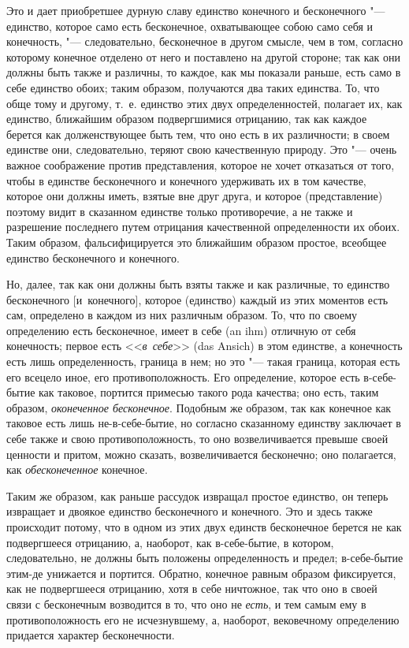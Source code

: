 Это и дает приобретшее дурную славу единство конечного и бесконечного
"--- единство, которое само есть бесконечное, охватывающее собою само себя и
конечность, "--- следовательно, бесконечное в другом смысле, чем в том,
согласно которому конечное отделено от него и поставлено на другой стороне;
так как они должны быть также и различны, то каждое, как мы показали
раньше, есть само в себе единство обоих; таким образом, получаются два
таких единства. То, что обще тому и другому, т.~е. единство этих двух
определенностей, полагает их, как единство, ближайшим образом подвергшимися
отрицанию, так как каждое берется как долженствующее быть тем, что оно есть
в их различности; в своем единстве они, следовательно, теряют свою
качественную природу. Это "--- очень важное соображение против представления,
которое не хочет отказаться от того, чтобы в единстве бесконечного и
конечного удерживать их в том качестве, которое они должны иметь, взятые
вне друг друга, и которое (представление) поэтому видит в сказанном
единстве только противоречие, а не также и разрешение последнего путем
отрицания качественной определенности их обоих. Таким образом,
фальсифицируется это ближайшим образом простое, всеобщее единство
бесконечного и конечного.

Но, далее, так как они должны быть взяты также и как различные, то единство
бесконечного [и~конечного], которое (единство) каждый из этих моментов есть
сам, определено в каждом из них различным образом. То, что по своему
определению есть бесконечное, имеет в себе (an ihm) отличную от себя
конечность; первое есть <<{\em в~себе}>> (das Ansich) в
этом единстве, а конечность есть лишь определенность, граница в нем; но это
"--- такая граница, которая есть его всецело иное, его
противоположность. Его определение, которое есть в-себе-бытие как таковое,
портится примесью такого рода качества; оно есть, таким образом,
{\em оконеченное бесконечное}. Подобным же образом, так
как конечное как таковое есть лишь не-в-себе-бытие, но согласно сказанному
единству заключает в себе также и свою противоположность, то оно
возвеличивается превыше своей ценности и притом, можно сказать,
возвеличивается бесконечно; оно полагается, как
{\em обесконеченное} конечное.

Таким же образом, как раньше рассудок извращал простое единство, он
теперь извращает и двоякое единство бесконечного и конечного.
Это и здесь также происходит потому, что в одном из этих двух единств
бесконечное берется не как подвергшееся отрицанию, а, наоборот, как
в-себе-бытие, в котором, следовательно, не должны быть положены
определенность и предел; в-себе-бытие этим-де унижается и портится.
Обратно, конечное равным образом фиксируется, как не подвергшееся
отрицанию, хотя в себе ничтожное, так что оно в своей связи с бесконечным
возводится в то, что оно не {\em есть}, и тем самым ему
в противоположность его не исчезнувшему, а, наоборот, вековечному
определению придается характер бесконечности.

